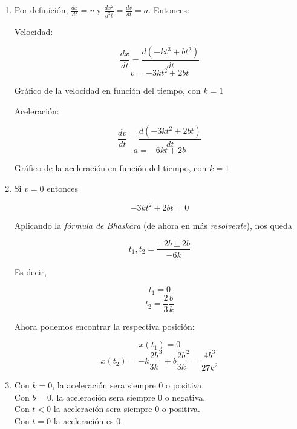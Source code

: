 \begin{enumerate}

\item

	Por definici\'on, $\frac{dx}{dt} = v$ y $\frac{dx^2}{d^2t} = \frac{dv}{dt} = a$. Entonces:

	Velocidad:

	$$ \frac{dx}{dt} = \frac{d(-kt^3 + bt^2)}{dt} $$
	$$ v = -3kt^2 + 2bt $$

	Gr\'afico de la velocidad en funci\'on del tiempo, con $k=1$

	

	Aceleraci\'on:

	$$ \frac{dv}{dt} = \frac{d(-3kt^2 + 2bt)}{dt} $$
	$$ a = -6kt + 2b $$

	Gr\'afico de la aceleraci\'on en funci\'on del tiempo, con $k=1$

	

\item

	Si $v = 0$ entonces
	
	$$ -3kt^2 + 2bt = 0$$
	
	Aplicando la \emph{f\'ormula de Bhaskara} (de ahora en m\'as \emph{resolvente}), nos queda
	
	$$ t_1, t_2 = \frac{-2b \pm 2b}{-6k} $$
	
	Es decir,
	
	$$ t_1 = 0$$
	$$ t_2 = \frac{2}{3} \frac{b}{k}$$
	
	Ahora podemos encontrar la respectiva posici\'on:
	
	$$ x(t_1) = 0 $$
	$$ x(t_2) = -k \frac{2b}{3k}^3 + b\frac{2b}{3k}^2 = \frac{4b^3}{27k^2}$$
	
\item

	Con $k = 0$, la aceleraci\'on sera siempre 0 o positiva. \\
	Con $b = 0$, la aceleraci\'on sera siempre 0 o negativa. \\
	Con $t < 0$ la aceleraci\'on sera siempre 0 o positiva. \\
	Con $t = 0$ la aceleraci\'on es 0.

\end{enumerate}